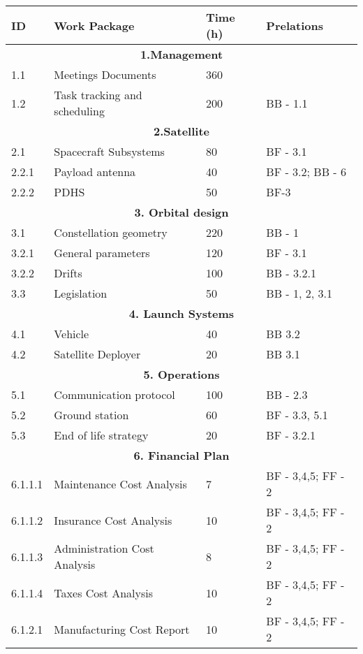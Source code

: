 \begin{longtable}{ | p{1.3cm} | p{7cm} | p{3cm} | p{3.5cm} |}
\hline

\textbf{ID }& \textbf{Work Package} & \textbf{Time (h)} & \textbf{Prelations} \\ \hline
\multicolumn{4}{|c|}{\textbf{1.Management}} \\ \hline
1.1 & Meetings Documents & 360 &   \\ \hline
1.2 & Task tracking and scheduling & 200 & BB - 1.1 \\ \hline
\multicolumn{4}{|c|}{\textbf{2.Satellite}} \\ \hline
2.1 & Spacecraft Subsystems & 80 & BF - 3.1 \\ \hline
2.2.1 & Payload antenna & 40 & BF - 3.2; BB - 6 \\ \hline
2.2.2 & PDHS & 50 & BF-3 \\ \hline
\multicolumn{4}{|c|}{\textbf{3. Orbital design}} \\ \hline
3.1 & Constellation geometry & 220 & BB - 1 \\ \hline
3.2.1 & General parameters & 120 & BF - 3.1 \\ \hline
3.2.2 & Drifts & 100 & BB - 3.2.1 \\ \hline
3.3 & Legislation & 50 & BB - 1, 2, 3.1 \\ \hline
\multicolumn{4}{|c|}{\textbf{4. Launch Systems}} \\ \hline
4.1 & Vehicle & 40 & BB 3.2 \\ \hline
4.2 & Satellite Deployer & 20 & BB 3.1  \\ \hline
\multicolumn{4}{|c|}{\textbf{5. Operations}} \\ \hline
5.1 & Communication protocol & 100 & BB - 2.3 \\ \hline
5.2 & Ground station & 60 & BF - 3.3, 5.1 \\ \hline
5.3 & End of life strategy & 20 & BF - 3.2.1 \\
\hline
\multicolumn{4}{|c|}{\textbf{6. Financial Plan}} \\ \hline
6.1.1.1 & Maintenance Cost Analysis & 7 & BF - 3,4,5; FF - 2 \\ \hline
6.1.1.2 & Insurance Cost Analysis & 10 & BF - 3,4,5; FF - 2 \\ \hline
6.1.1.3 & Administration Cost Analysis & 8 & BF - 3,4,5; FF - 2 \\ \hline
6.1.1.4 & Taxes Cost Analysis  & 10 & BF - 3,4,5; FF - 2  \\ \hline
6.1.2.1 & Manufacturing Cost Report & 10 & BF - 3,4,5; FF - 2  \\ \hline

\end{longtable}
